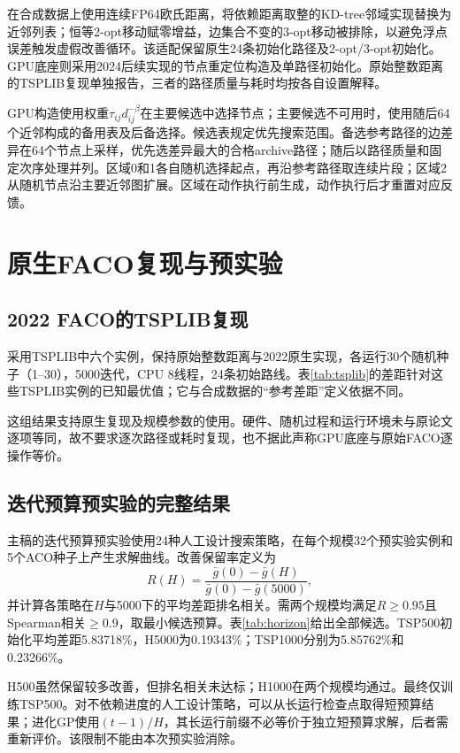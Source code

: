 \documentclass[runningheads,orivec]{llncs}
\begin{document}
\FACO{}在合成数据上使用连续FP64欧氏距离，将依赖距离取整的KD-tree邻域实现替换为近邻列表；恒等2-opt移动赋零增益，边集合不变的3-opt移动被排除，以避免浮点误差触发虚假改善循环。该适配保留原生24条初始化路径及2-opt/3-opt初始化。GPU底座则采用2024后续实现的节点重定位构造及单路径初始化。原始整数距离的TSPLIB复现单独报告，三者的路径质量与耗时均按各自设置解释。

GPU构造使用权重$\tau_{ij}d_{ij}^{-\beta}$在主要候选中选择节点；主要候选不可用时，使用随后64个近邻构成的备用表及后备选择。候选表规定优先搜索范围。备选参考路径的边差异在64个节点上采样，优先选差异最大的合格archive路径；随后以路径质量和固定次序处理并列。区域0和1各自随机选择起点，再沿参考路径取连续片段；区域2从随机节点沿主要近邻图扩展。区域在动作执行前生成，动作执行后才重置对应反馈。

\section{原生FACO复现与预实验}
\subsection{2022 FACO的TSPLIB复现}
采用TSPLIB\cite{reinelt1991}中六个实例，保持原始整数距离与2022原生实现\cite{skinderowicz2022}，各运行30个随机种子（1--30），5000迭代，CPU 8线程，24条初始路线。表\ref{tab:tsplib}的差距针对这些TSPLIB实例的已知最优值；它与合成数据的“参考差距”定义依据不同。
\begin{table}[htbp]\caption{原生FACO的180次TSPLIB运行。时间为现有运行记录，包含初始化。}\label{tab:tsplib}
\centering\small{}\end{table}
这组结果支持原生复现及规模参数的使用。硬件、随机过程和运行环境未与原论文逐项等同，故不要求逐次路径或耗时复现，也不据此声称GPU底座与原始FACO逐操作等价。

\subsection{迭代预算预实验的完整结果}
主稿的迭代预算预实验使用24种人工设计搜索策略，在每个规模32个预实验实例和5个ACO种子上产生求解曲线。改善保留率定义为
\begin{equation}
 R(H)=\frac{\bar g(0)-\bar g(H)}{\bar g(0)-\bar g(5000)},
\end{equation}
并计算各策略在$H$与5000下的平均差距排名相关。需两个规模均满足$R\ge0.95$且Spearman相关$\ge0.9$，取最小候选预算。表\ref{tab:horizon}给出全部候选。TSP500初始化平均差距5.83718\%，H5000为0.19343\%；TSP1000分别为5.85762\%和0.23266\%。
\begin{table}[htbp]\caption{人工设计搜索策略的迭代预算预实验。保留率衡量相对初始化的改善，不是终点差距的保留比例。}\label{tab:horizon}
\centering\small{}\end{table}
H500虽然保留较多改善，但排名相关未达标；H1000在两个规模均通过。最终仅训练TSP500。对不依赖进度的人工设计策略，可以从长运行检查点取得短预算结果；进化GP使用$(t-1)/H$，其长运行前缀不必等价于独立短预算求解，后者需重新评价。该限制不能由本次预实验消除。
\end{document}
